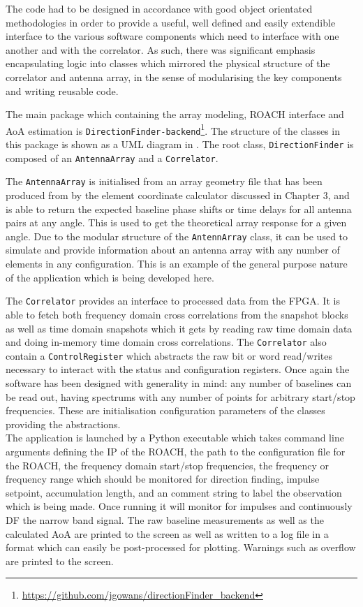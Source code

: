 The code had to be designed in accordance with good object orientated methodologies in order to provide a useful, well defined and easily extendible interface to the various software components which need to interface with one another and with the correlator. As such, there was significant emphasis encapsulating logic into classes which mirrored the physical structure of the correlator and antenna array, in the sense of modularising the key components and writing reusable code.

The main package which containing the array modeling, ROACH interface and AoA estimation is \lstinline{DirectionFinder-backend}\footnote{\url{https://github.com/jgowans/directionFinder_backend}}. The structure of the classes in this package is shown as a UML diagram in . The root class, \lstinline{DirectionFinder} is composed of an \lstinline{AntennaArray} and a \lstinline{Correlator}. 

The \lstinline{AntennaArray} is initialised from an array geometry file that has been produced from by the element coordinate calculator discussed in Chapter 3, and is able to return the expected baseline phase shifts or time delays for all antenna pairs at any angle. This is used to get the theoretical array response for a given angle. Due to the modular structure of the \lstinline{AntennArray} class, it can be used to simulate and provide information about an antenna array with any number of elements in any configuration. This is an example of the general purpose nature of the application which is being developed here.

The \lstinline{Correlator} provides an interface to processed data from the FPGA. It is able to fetch both frequency domain cross correlations from the snapshot blocks as well as time domain snapshots which it gets by reading raw time domain data and doing in-memory time domain cross correlations. The \lstinline{Correlator} also contain a \lstinline{ControlRegister} which abstracts the raw bit or word read/writes necessary to interact with the status and configuration registers. Once again the software has been designed with generality in mind: any number of baselines can be read out, having spectrums with any number of points for arbitrary start/stop frequencies. These are initialisation configuration parameters of the classes providing the abstractions.\\

The application is launched by a Python executable which takes command line arguments defining the IP of the ROACH, the path to the configuration file for the ROACH, the frequency domain start/stop frequencies, the frequency or frequency range which should be monitored for direction finding, impulse setpoint, accumulation length, and an comment string to label the observation which is being made. Once running it will monitor for impulses and continuously DF the narrow band signal. The raw baseline measurements as well as the calculated AoA are printed to the screen as well as written to a log file in a format which can easily be post-processed for plotting. Warnings such as overflow are printed to the screen.\\


